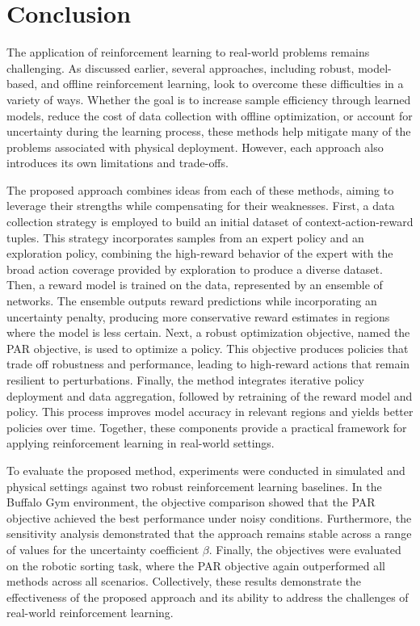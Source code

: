 \documentclass[./dissertation.tex]{subfiles}
\begin{document}
\chapter{Conclusion}
The application of reinforcement learning to real-world problems remains challenging. As discussed earlier, several approaches, including robust, model-based, and offline reinforcement learning, look to overcome these difficulties in a variety of ways. Whether the goal is to increase sample efficiency through learned models, reduce the cost of data collection with offline optimization, or account for uncertainty during the learning process, these methods help mitigate many of the problems associated with physical deployment. However, each approach also introduces its own limitations and trade-offs.

The proposed approach combines ideas from each of these methods, aiming to leverage their strengths while compensating for their weaknesses. First, a data collection strategy is employed to build an initial dataset of context-action-reward tuples. This strategy incorporates samples from an expert policy and an exploration policy, combining the high-reward behavior of the expert with the broad action coverage provided by exploration to produce a diverse dataset. Then, a reward model is trained on the data, represented by an ensemble of networks. The ensemble outputs reward predictions while incorporating an uncertainty penalty, producing more conservative reward estimates in regions where the model is less certain. Next, a robust optimization objective, named the PAR objective, is used to optimize a policy. This objective produces policies that trade off robustness and performance, leading to high-reward actions that remain resilient to perturbations. Finally, the method integrates iterative policy deployment and data aggregation, followed by retraining of the reward model and policy. This process improves model accuracy in relevant regions and yields better policies over time. Together, these components provide a practical framework for applying reinforcement learning in real-world settings.

To evaluate the proposed method, experiments were conducted in simulated and physical settings against two robust reinforcement learning baselines. In the Buffalo Gym environment, the objective comparison showed that the PAR objective achieved the best performance under noisy conditions. Furthermore, the sensitivity analysis demonstrated that the approach remains stable across a range of values for the uncertainty coefficient $\beta$. Finally, the objectives were evaluated on the robotic sorting task, where the PAR objective again outperformed all methods across all scenarios. Collectively, these results demonstrate the effectiveness of the proposed approach and its ability to address the challenges of real-world reinforcement learning.
\end{document}
